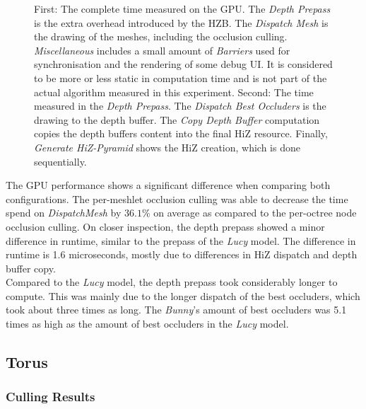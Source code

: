\begin{figure}[!htb]
  \caption{First: The complete time measured on the \ac{GPU}. The \emph{Depth Prepass} is the extra overhead 
  introduced by the \ac{HZB}. The \emph{Dispatch Mesh} is the drawing of the meshes, including the occlusion 
  culling. \emph{Miscellaneous} includes a small amount of \emph{Barriers} used for synchronisation and the 
  rendering of some debug \ac{UI}. It is considered to be more or less static in computation time and is not 
  part of the actual algorithm measured in this experiment. Second: The time measured in the \emph{Depth Prepass}. 
  The \emph{Dispatch Best Occluders} is the drawing to the depth buffer. The \emph{Copy Depth Buffer} computation 
  copies the depth buffers content into the final \ac{HiZ} resource. Finally, \emph{Generate HiZ-Pyramid} 
  shows the \ac{HiZ} creation, which is done sequentially.}
\end{figure}

\noindent
The \ac{GPU} performance shows a significant difference when comparing both configurations. The per-meshlet 
occlusion culling was able to decrease the time spend on \emph{DispatchMesh} by $36.1\%$ on average as compared 
to the per-octree node occlusion culling. On closer inspection, the depth prepass showed a minor difference 
in runtime, similar to the prepass of the \emph{Lucy} model. The difference in runtime is 1.6 microseconds, 
mostly due to differences in \ac{HiZ} dispatch and depth buffer copy. \\

\noindent
Compared to the \emph{Lucy} model, the depth prepass took considerably longer to compute. This was mainly due to 
the longer dispatch of the best occluders, which took about three times as long. The \emph{Bunny}'s amount of 
best occluders was 5.1 times as high as the amount of best occluders in the \emph{Lucy} model.

\clearpage




\subsection*{Torus}

\subsubsection*{Culling Results} \label{subsubsec-culling-results-torus}



